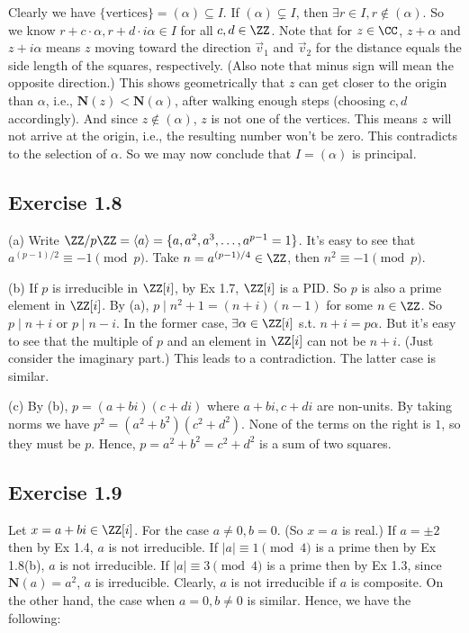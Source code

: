 \documentclass[../Chapter.tex]{subfiles}
\begin{document}
Clearly we have $\{\text{vertices}\}=(\alpha)\subseteq I$. If $(\alpha)\varsubsetneq I$, then $\exists r\in I,r\notin(\alpha)$. So we know $r+c\cdot\alpha,r+d\cdot i\alpha\in I$ for all $c,d\in\ZZ$. Note that for $z\in\CC$, $z+\alpha$ and $z+i\alpha$ means $z$ moving toward the direction $\vec v_1$ and $\vec v_2$ for the distance equals the side length of the squares, respectively. (Also note that minus sign will mean the opposite direction.) This shows geometrically that $z$ can get closer to the origin than $\alpha$, i.e., $\mathbf{N}(z)<\mathbf{N}(\alpha)$, after walking enough steps (choosing $c,d$ accordingly). And since $z\notin(\alpha)$, $z$ is not one of the vertices. This means $z$ will not arrive at the origin, i.e., the resulting number won't be zero. This contradicts to the selection of $\alpha$. So we may now conclude that $I=(\alpha)$ is principal.
 
\subsection*{Exercise 1.8}

(a) Write $\ZZ/p\ZZ=\langle a \rangle=\{a,a^2,a^3,\ldots,a^{p-1}=1\}$. It's easy to see that $a^{(p-1)/2}\equiv -1 \pmod{p}$. Take $n=a^{(p-1)/4}\in\ZZ$, then $n^2\equiv -1\pmod{p}$.

(b) If $p$ is irreducible in $\ZZ[i]$, by Ex 1.7, $\ZZ[i]$ is a PID. So $p$ is also a prime element in $\ZZ[i]$. By (a), $p\mid n^2+1=(n+i)(n-1)$ for some $n\in\ZZ$. So $p\mid n+i$ or $p\mid n-i$. In the former case, $\exists \alpha\in\ZZ[i]$ s.t. $n+i=p\alpha$. But it's easy to see that the multiple of $p$ and an element in $\ZZ[i]$ can not be $n+i$. (Just consider the imaginary part.) This leads to a contradiction. The latter case is similar.

(c) By (b), $p=(a+bi)(c+di)$ where $a+bi,c+di$ are non-units. By taking norms we have $p^2=(a^2+b^2)(c^2+d^2)$. None of the terms on the right is $1$, so they must be $p$. Hence, $p=a^2+b^2=c^2+d^2$ is a sum of two squares.

\subsection*{Exercise 1.9}

Let $x=a+bi\in\ZZ[i]$. For the case $a\neq 0,b=0$. (So $x=a$ is real.) If $a=\pm2$ then by Ex 1.4, $a$ is not irreducible. If $|a|\equiv 1\pmod{4}$ is a prime then by Ex 1.8(b), $a$ is not irreducible. If $|a|\equiv 3\pmod{4}$ is a prime then by Ex 1.3, since $\mathbf{N}(a)=a^2$, $a$ is irreducible. Clearly, $a$ is not irreducible if $a$ is composite. On the other hand, the case when $a=0,b\neq 0$ is similar. Hence, we have the following:
\end{document}

